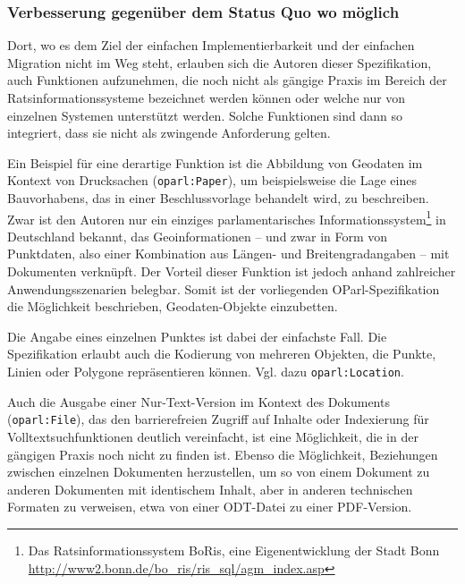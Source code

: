 \documentclass[,a4paper]{article}
\begin{document}
\subsubsection{Verbesserung gegenüber dem Status Quo wo
möglich}\label{verbesserung-gegenuxfcber-dem-status-quo-wo-muxf6glich}

Dort, wo es dem Ziel der einfachen Implementierbarkeit und der einfachen
Migration nicht im Weg steht, erlauben sich die Autoren dieser
Spezifikation, auch Funktionen aufzunehmen, die noch nicht als gängige
Praxis im Bereich der Ratsinformationssysteme bezeichnet werden können
oder welche nur von einzelnen Systemen unterstützt werden. Solche
Funktionen sind dann so integriert, dass sie nicht als zwingende
Anforderung gelten.

Ein Beispiel für eine derartige Funktion ist die Abbildung von Geodaten
im Kontext von Drucksachen (\texttt{oparl:Paper}), um beispielsweise die
Lage eines Bauvorhabens, das in einer Beschlussvorlage behandelt wird,
zu beschreiben. Zwar ist den Autoren nur ein einziges parlamentarisches
Informationssystem\footnote{Das Ratsinformationssystem BoRis, eine
  Eigenentwicklung der Stadt Bonn
  \url{http://www2.bonn.de/bo_ris/ris_sql/agm_index.asp}} in Deutschland
bekannt, das Geoinformationen -- und zwar in Form von Punktdaten, also
einer Kombination aus Längen- und Breitengradangaben -- mit Dokumenten
verknüpft. Der Vorteil dieser Funktion ist jedoch anhand zahlreicher
Anwendungsszenarien belegbar. Somit ist der vorliegenden
OParl-Spezifikation die Möglichkeit beschrieben, Geodaten-Objekte
einzubetten.

Die Angabe eines einzelnen Punktes ist dabei der einfachste Fall. Die
Spezifikation erlaubt auch die Kodierung von mehreren Objekten, die
Punkte, Linien oder Polygone repräsentieren können. Vgl. dazu
\texttt{oparl:Location}.

Auch die Ausgabe einer Nur-Text-Version im Kontext des Dokuments
(\texttt{oparl:File}), das den barrierefreien Zugriff auf Inhalte oder
Indexierung für Volltextsuchfunktionen deutlich vereinfacht, ist eine
Möglichkeit, die in der gängigen Praxis noch nicht zu finden ist. Ebenso
die Möglichkeit, Beziehungen zwischen einzelnen Dokumenten herzustellen,
um so von einem Dokument zu anderen Dokumenten mit identischem Inhalt,
aber in anderen technischen Formaten zu verweisen, etwa von einer
ODT-Datei zu einer PDF-Version.

\end{document}
